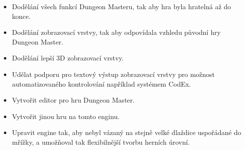 \begin{itemize}
\item Dodělání všech funkcí Dungeon Masteru, tak aby hra byla hratelná až do konce.
\item Dodělání zobrazovací vrstvy, tak aby odpovídala vzhledu původní hry Dungeon Master.
\item Dodělání lepší 3D zobrazovací vrstvy.
\item Udělat podporu pro textový výstup zobrazovací vrstvy pro možnost automatizovaného kontrolování například systémem CodEx. 
\item Vytvořit editor pro hru Dungeon Master. 
\item Vytvořit jinou hru na tomto enginu.
\item Upravit engine tak, aby nebyl vázaný na stejně velké dlaždice uspořádané do mřížky, a umožňoval tak
	flexibilnější tvorbu herních úrovní. 
\end{itemize}







